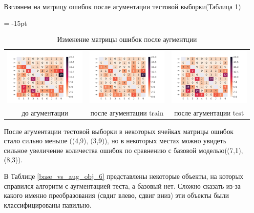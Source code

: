 \documentclass[12pt,fleqn]{article}
\begin{document}
Взглянем на матрицу ошибок после агументации тестовой выборки(Таблица \ref{conf_matrix_aug_6})
\begin{table}[htb]
    \centering
    \tabcolsep = -15pt
    \begin{tabular}{ccc}
        \includegraphics[width=7cm]{task4.pdf} & \includegraphics[width=7cm]{task5_conf_mat.pdf} & \includegraphics[width=7cm]{task6.pdf}\\
        до агументации & после агументации train & после агументации test
    \end{tabular}
    \caption{Изменение матрицы ошибок после аугментции}
    \label{conf_matrix_aug_6}
\end{table}
После агументации тестовой выборки в некоторых ячейках матрицы ошибок стало сильно меньше ((4,9), (3,9)), но в некоторых местах
можно увидеть сильное увеличение количества ошибок по сравнению с базовой моделью((7,1), (8,3)).

В Таблице \ref{base_vs_aug_obj_6} представлены некоторые объекты, 
на которых справился алгоритм с аугментацией теста, а базовый нет. Сложно сказать из-за какого именно преобразования
(свдиг влево, сдвиг вниз) эти объекты были классифицированы павильно.
\end{document}
